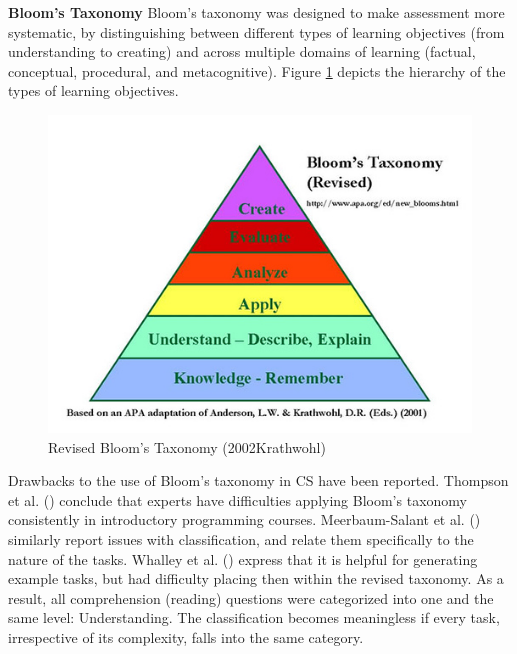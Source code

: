 \textbf{Bloom's Taxonomy}\newline
Bloom's taxonomy was designed to make assessment more systematic, by distinguishing between different types of learning objectives (from understanding to creating) and across multiple domains of learning (factual, conceptual, procedural, and metacognitive). Figure \ref{fig:BloomsRevised} depicts the hierarchy of the types of learning objectives.


\begin{figure}
\includegraphics[scale=0.6]{figures/bloomsrevised.jpg}
\caption{Revised Bloom's Taxonomy (2002Krathwohl)}\label{fig:BloomsRevised}
\end{figure}


Drawbacks to the use of Bloom's taxonomy in CS have been reported. Thompson et al. (\cite{thompson2008bloom}) conclude that experts have difficulties applying Bloom's taxonomy consistently in introductory programming courses. Meerbaum-Salant et al. (\cite{Meerbaum2013}) similarly report issues with classification, and relate them specifically to the nature of the tasks. Whalley et al. (\cite{Whalley2006}) express that it is helpful for generating example tasks, but had difficulty placing then within the revised taxonomy. As a result, all comprehension (reading) questions were categorized into one and the same level: Understanding. The classification becomes meaningless if every task, irrespective of its complexity, falls into the same category.


